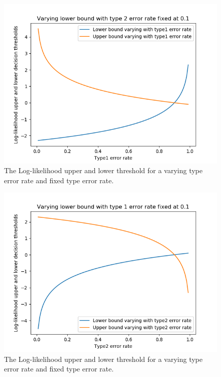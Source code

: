 \begin{figure}
    \centering
    \includegraphics[width = 0.75\linewidth]{Chapters/MultiAgentTargetDetection/Figs/SearchTermination/SPRTDecisionThresholdVaryingT1ErrorRate.png}
    \caption{The Log-likelihood upper and lower threshold for a varying type  error rate and fixed type  error rate.}
    \label{fig:SPRTVaryingT1}
\end{figure}

\begin{figure}
    \centering
    \includegraphics[width = 0.75\linewidth]{Chapters/MultiAgentTargetDetection/Figs/SearchTermination/SPRTDecisionThresholdVaryingT2ErrorRate.png}
    \caption{The Log-likelihood upper and lower threshold for a varying type  error rate and fixed type  error rate.}
    \label{fig:SPRTVaryingT2}
\end{figure}

